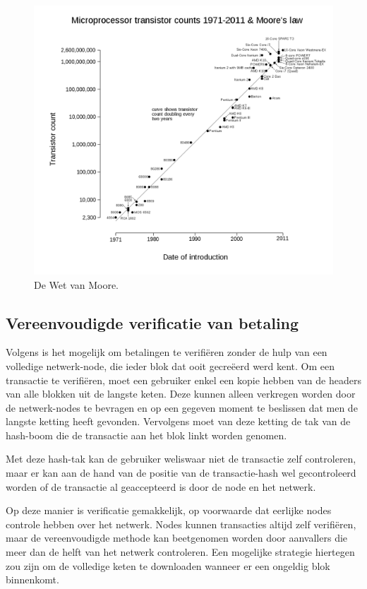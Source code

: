 		\begin{figure}
			\includegraphics[width=\linewidth]{img/moore.png}
			\caption{De Wet van Moore.}
			\label{fig:moore}
		\end{figure}
		
		\subsection{Vereenvoudigde verificatie van betaling}
		Volgens \textcite{Nakamoto2008} is het mogelijk om betalingen te verifiëren zonder de hulp van een volledige netwerk-node, die ieder blok dat ooit gecreëerd werd kent. Om een transactie te verifiëren, moet een gebruiker enkel een kopie hebben van de headers van alle blokken uit de langste keten. Deze kunnen alleen verkregen worden door de netwerk-nodes te bevragen en op een gegeven moment te beslissen dat men de langste ketting heeft gevonden. Vervolgens moet van deze ketting de tak van de hash-boom die de transactie aan het blok linkt worden genomen.
	
		Met deze hash-tak kan de gebruiker weliswaar niet de transactie zelf controleren, maar er kan aan de hand van de positie van de transactie-hash wel gecontroleerd worden of de transactie al geaccepteerd is door de node en het netwerk.
		
		Op deze manier is verificatie gemakkelijk, op voorwaarde dat eerlijke nodes controle hebben over het netwerk. Nodes kunnen transacties altijd zelf verifiëren, maar de vereenvoudigde methode kan beetgenomen worden door aanvallers die meer dan de helft van het netwerk controleren. Een mogelijke strategie hiertegen zou zijn om de volledige keten te downloaden wanneer er een ongeldig blok binnenkomt. 
